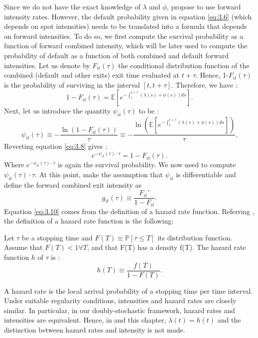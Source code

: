 Since we do not have the exact knowledge of $\lambda$ and $\phi$, \citet{Duan2012} propose to use forward intensity rates. However, the default probability given in equation \ref{eq:3.6} (which depends on spot intensities) needs to be translated into a formula that depends on forward intensities. To do so, we first compute the survival probability as a function of forward combined intensity, which will be later used to compute the probability of default as a function of both combined and default forward intensities. Let us denote by $F_{it}(\tau)$ the conditional distribution function of the combined (default and other exits) exit time evaluated at $t+\tau$. Hence, 1-$F_{it}(\tau)$ is the probability of surviving in the interval $[t, t+\tau ]$. Therefore, we have :
\begin{equation}
1-F_{it}(\tau) = \mathbb{E}[e^{-\int_t^{t+\tau} (\lambda(s)+\phi(s)) ds}].
\end{equation}
Next, let us introduce the quantity $\psi_{it}(\tau)$ to be :
\begin{equation} \label{eq:3.8}
\psi_{it}(\tau) \equiv -\frac{\ln(1-F_{it}(\tau))}{\tau} \equiv -\frac{\ln(\mathbb{E}[e^{-\int_t^{t+\tau} (\lambda(s)+\phi(s)) ds}])}{\tau}.
\end{equation}
Reverting equation \ref{eq:3.8} gives :
\begin{equation}\label{eq:psi}
e^{-\psi_{it}(\tau)\cdot\tau} = 1-F_{it}(\tau).
\end{equation}
Where $e^{-\psi_{it}(\tau)\cdot\tau}$ is again the survival probability. We now need to compute $\psi_{it}(\tau)\cdot\tau$. At this point, \citet{Duan2012} make the assumption that $\psi_{it}$ is differentiable and define the forward combined exit intensity as 
\begin{equation} \label{eq:3.10}
g_{it}(\tau) \equiv \frac{F_{it}'}{1-F_{it}}.
\end{equation}
Equation \ref{eq:3.10} comes from the definition of a hazard rate function. Referring \citet{book}, the definition of a hazard rate function is the following:
\begin{definition}
Let $\tau$ be a stopping time and $F(T) \equiv \mathbb{P}[\tau \leq T]$ its distribution function. Assume that $F(T) < 1 \forall T$, and that F(T) has a density f(T). The hazard rate function $h$ of $\tau$ is :
\begin{equation*}
h(T) \equiv \frac{f(T)}{1-F(T)}.
\end{equation*}
\end{definition}
A hazard rate is the local arrival probability of a stopping time per time interval. Under suitable regularity conditions, intensities and hazard rates are closely similar. In particular, in our doubly-stochastic framework, hazard rates and intensities are equivalent. Hence, in \citet{Duan2012} and this chapter, $\lambda(t) = h(t)$ and the distinction between hazard rates and intensity is not made. \\

